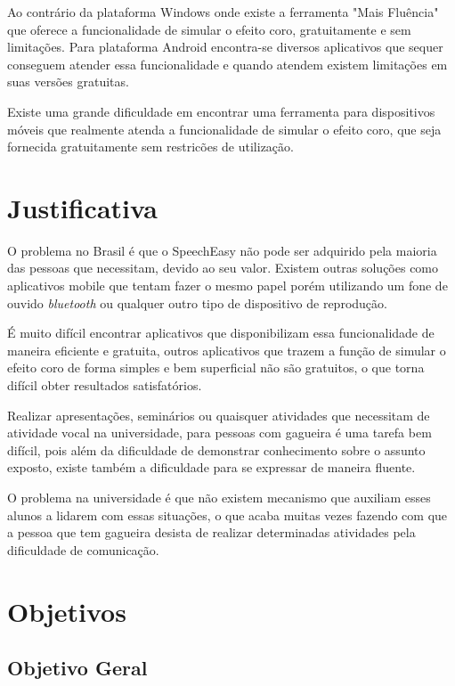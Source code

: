 Ao contr\'ario da plataforma Windows onde existe a ferramenta "Mais Flu\^encia" que oferece a funcionalidade de simular o efeito coro, gratuitamente e sem limita\c{c}\~oes. Para plataforma Android encontra-se diversos aplicativos que sequer conseguem atender essa funcionalidade e quando atendem existem limita\c{c}\~oes em suas vers\~oes gratuitas.

Existe uma grande dificuldade em encontrar uma ferramenta para dispositivos m\'oveis que realmente atenda a funcionalidade de simular o efeito coro, que seja fornecida gratuitamente sem restric\~oes de utiliza\c{c}\~ao. 

\section{Justificativa}

O problema no Brasil \'e que o SpeechEasy n\~ao pode ser adquirido pela maioria das pessoas que necessitam, devido ao seu valor. Existem outras solu\c{c}\~oes como aplicativos mobile que tentam fazer o mesmo papel por\'em utilizando um fone de ouvido \textit{bluetooth} ou qualquer outro tipo de dispositivo de reprodu\c{c}\~ao. 

\'E muito dif\'icil encontrar aplicativos que disponibilizam essa funcionalidade de maneira eficiente e gratuita, outros aplicativos que trazem a fun\c{c}\~ao de simular o efeito coro de forma simples e bem superficial n\~ao s\~ao gratuitos, o que torna dif\'icil obter resultados satisfat\'orios. 

Realizar apresenta\c{c}\~oes, semin\'arios ou quaisquer atividades que necessitam de atividade vocal na universidade, para pessoas com gagueira \'e uma tarefa bem dif\'icil, pois al\'em da dificuldade de demonstrar conhecimento sobre o assunto exposto, existe tamb\'em a dificuldade para se expressar de maneira fluente. 

O problema na universidade \'e que n\~ao existem mecanismo que auxiliam esses alunos a lidarem com essas situa\c{c}\~oes, o que acaba muitas vezes fazendo com que a pessoa que tem gagueira desista de realizar determinadas atividades pela dificuldade de comunica\c{c}\~ao.


\section{Objetivos}

\subsection{Objetivo Geral}

